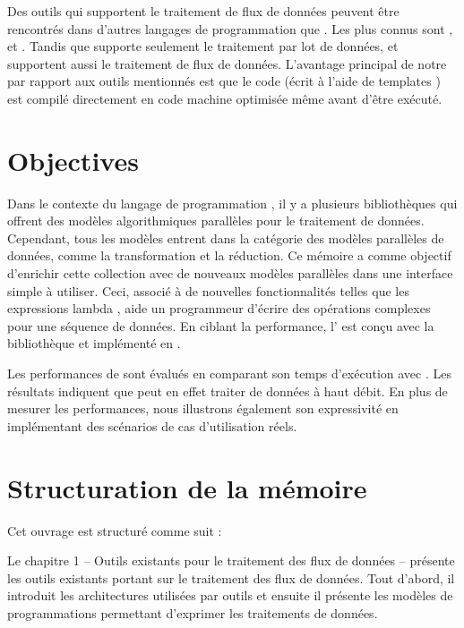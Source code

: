 \begin{introduction}
Des outils qui supportent le traitement de flux de donn\'ees peuvent \^etre rencontr\'es dans d'autres langages de programmation que . Les plus connus sont  \citep{frampton2015mastering},  \citep{warburton2014java} et  \citep{flinkReferenceEnLigne}. Tandis que  supporte seulement le traitement par lot de données,  et  supportent aussi le traitement de flux de donn\'ees. L'avantage principal de notre  par rapport aux outils mentionn\'es est que le code (\'ecrit \`a l'aide de templates ) est compil\'e directement en code machine optimis\'ee m\^eme avant d'\^etre ex\'ecut\'e. 


\section*{Objectives}

Dans le contexte du langage de programmation , il y a plusieurs biblioth\`eques qui offrent des mod\`eles algorithmiques parall\`eles pour le traitement de donn\'ees. Cependant, tous les mod\`eles entrent dans la cat\'egorie des mod\`eles parall\`eles de donn\'ees, comme la transformation et la r\'eduction. Ce m\'emoire a comme objectif d'enrichir cette collection avec de nouveaux mod\`eles parall\`eles dans une interface simple \`a utiliser. Ceci, associ\'e \`a de nouvelles fonctionnalit\'es telles que les expressions lambda \citep{josuttis2012c++}, aide un programmeur d'\'ecrire des op\'erations complexes pour une s\'equence de donn\'ees. En ciblant la performance, l' est con\c cu avec la biblioth\`eque  et impl\'ement\'e en .

Les performances de  sont \'evalu\'es en comparant son temps d'ex\'ecution avec . Les r\'esultats indiquent que  peut en effet traiter de donn\'ees \`a haut d\'ebit. En plus de mesurer les performances, nous illustrons \'egalement son expressivit\'e en impl\'ementant des sc\'enarios de cas d'utilisation r\'eels.


\section*{Structuration de la m\'emoire}

Cet ouvrage est structur\'e comme suit :

Le chapitre 1 -- Outils existants pour le traitement des flux de donn\'ees -- pr\'esente les outils existants portant sur le traitement des flux de donn\'ees.  Tout d'abord, il introduit les architectures utilis\'ees par outils et ensuite il pr\'esente les mod\`eles de programmations permettant d'exprimer les traitements de donn\'ees.


\end{introduction}
